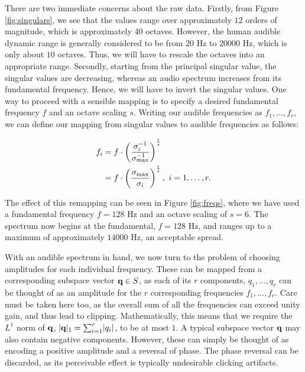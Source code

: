 \documentclass[11pt]{article}
\begin{document}
There are two immediate concerns about the raw data. Firstly, from Figure \ref{fig:singulars}, we see that the values range over approximately $12$ orders of magnitude, which is approximately $40$ octaves. However, the human audible dynamic range is generally considered to be from $20$ Hz to $20000$ Hz, which is only about $10$ octaves. Thus, we will have to rescale the octaves into an appropriate range. Secondly, starting from the principal singular value, the singular values are decreasing, whereas an audio spectrum increases from its fundamental frequency. Hence, we will have to invert the singular values. One way to proceed with a sensible mapping is to specify a desired fundamental frequency $f$ and an octave scaling $s$. Writing our audible frequencies as $f_1, \ldots, f_r$, we can define our mapping from singular values to audible frequencies as follows:

\begin{equation} 
\begin{aligned}
f_i &= f \cdot \left(\frac{\sigma_{i}^{-1}}{\sigma_{\textnormal{max}}^{-1}}\right)^{\frac{1}{s}} \\
&= f \cdot \left(\frac{\sigma_{\textnormal{max}}}{\sigma_i}\right)^{\frac{1}{s}}, \ i = 1, \ldots, r.
\end{aligned}
\end{equation}

The effect of this remapping can be seen in Figure \ref{fig:freqs}, where we have used a fundamental frequency $f = 128$ Hz and an octave scaling of $s = 6$. The spectrum now begins at the fundamental, $f = 128$ Hz, and ranges up to a maximum of approximately $14000$ Hz, an acceptable spread.

With an audible spectrum in hand, we now turn to the problem of choosing amplitudes for each individual frequency. These can be mapped from a corresponding subspace vector $\mathbf{q} \in S$, as each of its $r$ components, $q_1, \ldots, q_r$ can be thought of as an amplitude for the $r$ corresponding frequencies $f_1, \ldots, f_r$. Care must be taken here too, as the overall sum of all the frequencies can exceed unity gain, and thus lead to clipping. Mathematically, this means that we require the $L^1$ norm of $\mathbf{q}$, $\lvert\mathbf{q}\rvert_1 = \sum_{i=1}^{r}\lvert q_i \rvert$, to be at most $1$. A typical subspace vector $\mathbf{q}$ may also contain negative components. However, these can simply be thought of as encoding a positive amplitude and a reversal of phase. The phase reversal can be discarded, as its perceivable effect is typically undesirable clicking artifacts.
\end{document}
